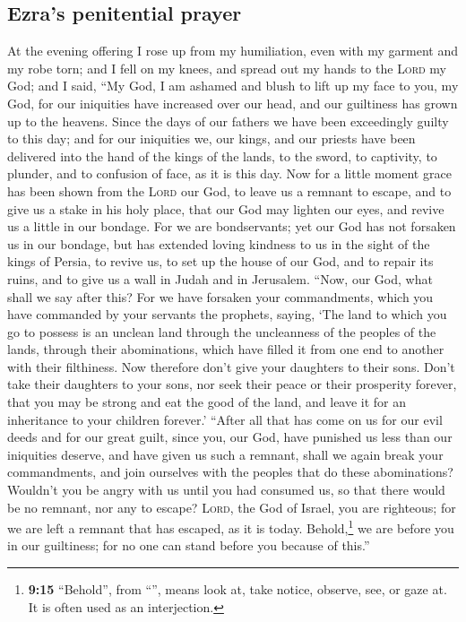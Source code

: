 \hypertarget{ezras-penitential-prayer}{%
\subsection{Ezra's penitential prayer}\label{ezras-penitential-prayer}}

 At the evening offering I rose up from my humiliation,
even with my garment and my robe torn; and I fell on my knees, and
spread out my hands to the \textsc{Lord} my God;  and I
said, ``My God, I am ashamed and blush to lift up my face to you, my
God, for our iniquities have increased over our head, and our guiltiness
has grown up to the heavens.  Since the days of our
fathers we have been exceedingly guilty to this day; and for our
iniquities we, our kings, and our priests have been delivered into the
hand of the kings of the lands, to the sword, to captivity, to plunder,
and to confusion of face, as it is this day.  Now for a
little moment grace has been shown from the \textsc{Lord} our God, to
leave us a remnant to escape, and to give us a stake in his holy place,
that our God may lighten our eyes, and revive us a little in our
bondage.  For we are bondservants; yet our God has not
forsaken us in our bondage, but has extended loving kindness to us in
the sight of the kings of Persia, to revive us, to set up the house of
our God, and to repair its ruins, and to give us a wall in Judah and in
Jerusalem.  ``Now, our God, what shall we say after this?
For we have forsaken your commandments,  which you have
commanded by your servants the prophets, saying, `The land to which you
go to possess is an unclean land through the uncleanness of the peoples
of the lands, through their abominations, which have filled it from one
end to another with their filthiness.  Now therefore
don't give your daughters to their sons. Don't take their daughters to
your sons, nor seek their peace or their prosperity forever, that you
may be strong and eat the good of the land, and leave it for an
inheritance to your children forever.'  ``After all that
has come on us for our evil deeds and for our great guilt, since you,
our God, have punished us less than our iniquities deserve, and have
given us such a remnant,  shall we again break your
commandments, and join ourselves with the peoples that do these
abominations? Wouldn't you be angry with us until you had consumed us,
so that there would be no remnant, nor any to escape? 
\textsc{Lord}, the God of Israel, you are righteous; for we are left a
remnant that has escaped, as it is today. Behold,\footnote{\textbf{9:15}
  ``Behold'', from ``'', means look at, take notice,
  observe, see, or gaze at. It is often used as an interjection.} we are
before you in our guiltiness; for no one can stand before you because of
this.''

